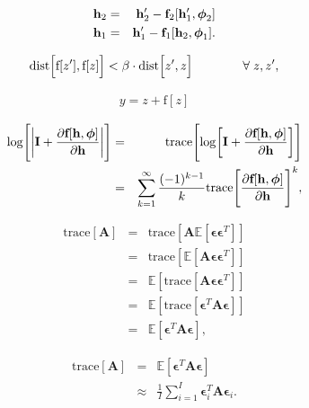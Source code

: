 \documentclass[letterpaper,twoside,openany, titlepage,oldfontcommands,titles,dvipsnames]{memoir}
\begin{document}
\begin{eqnarray}
  \mathbf{h}_{2}&=& \mathbf{h}'_{2}-\mbox{\bf f}_{2}[\mathbf{h}'_{1},\boldsymbol\phi_{2}]\nonumber \\
  \mathbf{h}_{1}&=& \mathbf{h}'_{1}-\mbox{\bf f}_{1}[\mathbf{h}_{2},\boldsymbol\phi_{1}].
 \end{eqnarray}

\begin{eqnarray}\label{eq:flow_contraction}
 \mbox{dist}\Bigl[\mbox{f}[z^{\prime}],\mbox{f}[z]\Bigr] < \beta\cdot \mbox{dist}\Bigl[z^{\prime}, z\Bigr]\quad\quad\quad\quad \forall\; z,z^{\prime},
 \end{eqnarray}

\begin{eqnarray}
  y = z+ \mbox{f}[z]
 \end{eqnarray}

\begin{eqnarray}\label{eq:flow_irevnet1}
 \log\Biggl[\biggl|\mathbf{I} + \frac{\partial \mbox{\bf f}[\mathbf{h},\boldsymbol\phi]}{\partial \mathbf{h}}\biggr|\Biggr] &=& \mbox{trace}\Biggl[\log\biggl[\mathbf{I} + \frac{\partial \mbox{\bf f}[\mathbf{h},\boldsymbol\phi]}{\partial \mathbf{h}}\biggr]\Biggr]\nonumber \\
 &=& \sum_{k=1}^{\infty}\frac{(-1)^{k-1}}{k}\mbox{trace}\Biggl[\frac{\partial \mbox{\bf f}[\mathbf{h},\boldsymbol\phi]}{\partial \mathbf{h}}\Biggr]^{k},
 \end{eqnarray}

\begin{eqnarray}
 \mbox{trace}[\mathbf{A}] &=& \mbox{trace}\left[\mathbf{A}\mathbb{E}\left[\boldsymbol\epsilon\boldsymbol\epsilon^{T}\right]\right]\nonumber \\
  &=& \mbox{trace}\left[\mathbb{E}\left[\mathbf{A}\boldsymbol\epsilon\boldsymbol\epsilon^{T}\right]\right]\nonumber \\
 &=& \mathbb{E}\left[\mbox{trace}\left[\mathbf{A}\boldsymbol\epsilon\boldsymbol\epsilon^{T}\right]\right]\nonumber \\
 &=& \mathbb{E}\left[\mbox{trace}\left[\boldsymbol\epsilon^{T}\mathbf{A}\boldsymbol\epsilon\right]\right]\nonumber \\
 &=& \mathbb{E}\left[\boldsymbol\epsilon^{T}\mathbf{A}\boldsymbol\epsilon\right],
 \end{eqnarray}

\begin{eqnarray}
 \mbox{trace}[\mathbf{A}] &=& \mathbb{E}\left[\boldsymbol\epsilon^{T}\mathbf{A}\boldsymbol\epsilon\right]\nonumber \\
 &\approx& \frac{1}{I}\sum_{i=1}^{I}\boldsymbol\epsilon_{i}^{T}\mathbf{A}\boldsymbol\epsilon_{i}.
 \end{eqnarray}
\end{document}
